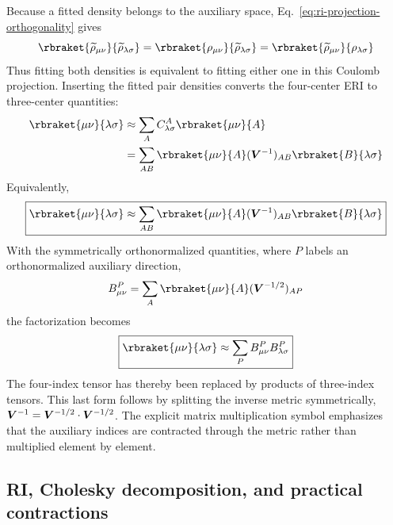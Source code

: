 Because a fitted density belongs to the auxiliary space,
Eq.~\eqref{eq:ri-projection-orthogonality} gives
\begin{equation}
 \rbraket{\widetilde\rho_{\mu\nu}}{\widetilde\rho_{\lambda\sigma}}
 =\rbraket{\rho_{\mu\nu}}{\widetilde\rho_{\lambda\sigma}}
 =\rbraket{\widetilde\rho_{\mu\nu}}{\rho_{\lambda\sigma}}
\end{equation}
Thus fitting both densities is equivalent to fitting either one in this
Coulomb projection. Inserting the fitted pair densities converts the
four-center ERI to three-center quantities:
\begin{equation}
\begin{split}
 \rbraket{\mu\nu}{\lambda\sigma}
 &\approx\sum_A C_{\lambda\sigma}^A\rbraket{\mu\nu}{A}\\
 &=\sum_{AB}\rbraket{\mu\nu}{A}(\bV^{-1})_{AB}
 \rbraket{B}{\lambda\sigma}
\end{split}
\end{equation}
Equivalently,
\begin{equation}
  \boxed{
 \rbraket{\mu\nu}{\lambda\sigma}
 \approx\sum_{AB}\rbraket{\mu\nu}{A}(\bV^{-1})_{AB}
 \rbraket{B}{\lambda\sigma}
  }
\end{equation}
With the symmetrically orthonormalized quantities, where $P$ labels an
orthonormalized auxiliary direction,
\begin{equation}
 B_{\mu\nu}^P=\sum_A\rbraket{\mu\nu}{A}(\bV^{-1/2})_{AP}
\end{equation}
the factorization becomes
\begin{equation}
  \boxed{
 \rbraket{\mu\nu}{\lambda\sigma}
 \approx\sum_PB_{\mu\nu}^PB_{\lambda\sigma}^P
  }
\end{equation}
The four-index tensor has thereby been replaced by products of three-index
tensors.
This last form follows by splitting the inverse metric symmetrically,
$\boldsymbol{V}^{-1}=\boldsymbol{V}^{-1/2}\cdot\boldsymbol{V}^{-1/2}$. The explicit matrix multiplication
symbol emphasizes that the auxiliary indices are contracted through the
metric rather than multiplied element by element.

\subsection{RI, Cholesky decomposition, and practical contractions}

